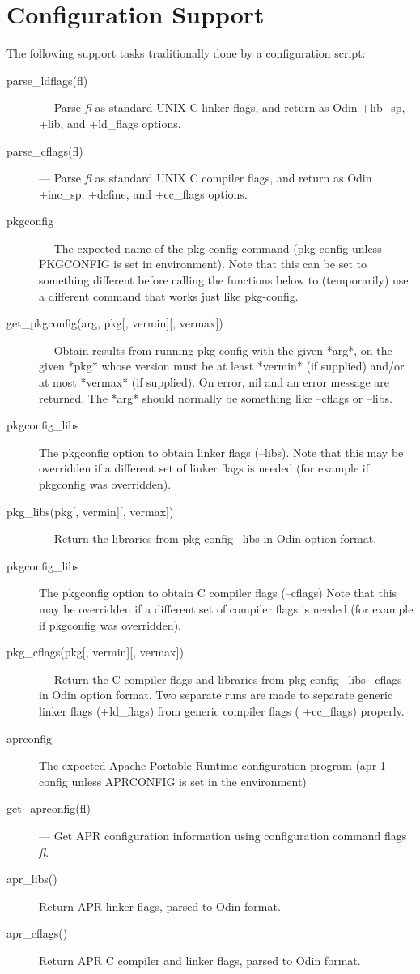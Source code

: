 \section{Configuration Support}

The following support tasks traditionally done by a configuration
script:

\begin{description}
\item[parse\_ldflags(fl)] --- Parse \emph{fl} as standard UNIX C
linker flags, and return as Odin {\ex +lib\_sp}, {\ex +lib}, and
{+ld\_flags} options.
\item [parse\_cflags(fl)] --- Parse \emph{fl} as standard UNIX C
compiler flags, and return as Odin {\ex +inc\_sp}, {\ex +define}, and
{+cc\_flags} options.
\item[pkgconfig] --- The expected name of the {\ex pkg-config}
command ({\ex pkg-config} unless PKGCONFIG is set in environment).  Note that
this can be set to something different before calling the functions below to
(temporarily) use a different command that works just like {\ex pkg-config}.
\item[get\_pkgconfig(arg, pkg{[}, vermin{]}{[}, vermax{]})] --- Obtain results
from running {\ex pkg-config} with the given *arg*, on the given *pkg*
whose version must be at least *vermin* (if supplied) and/or at most
*vermax* (if supplied).  On error, nil and an error message are returned.
The *arg* should normally be something like {\ex --cflags} or {\ex
--libs}.
\item[pkgconfig\_libs] The {\ex pkgconfig} option to obtain linker flags
({\ex --libs}).  Note that this may be overridden if a different set
of linker flags is needed (for example if {\ex pkgconfig} was
overridden).
\item[pkg\_libs(pkg{[}, vermin{]}{[}, vermax{]})] --- Return the
libraries from {\ex pkg-config --libs} in Odin option format.
\item[pkgconfig\_libs] The {\ex pkgconfig} option to obtain C compiler flags
({\ex --cflags})  Note that this may be overridden if a different set
of compiler flags is needed (for example if {\ex pkgconfig} was
overridden).
\item[pkg\_cflags(pkg{[}, vermin{]}{[}, vermax{]})] --- Return the C
compiler flags and libraries from {\ex pkg-config --libs --cflags} in
Odin option format.  Two separate runs are made to separate generic
linker flags ({\ex +ld\_flags}) from generic compiler flags ({\ex
+cc\_flags}) properly.
\item[aprconfig] The expected Apache Portable Runtime configuration
program ({\ex apr-1-config} unless APRCONFIG is set in the environment)
\item[get\_aprconfig(fl)] --- Get APR configuration information using
configuration command flags \emph{fl}.
\item[apr\_libs()] Return APR linker flags, parsed to Odin format.
\item[apr\_cflags()] Return APR C compiler and linker flags, parsed to Odin
format.
\end{description}

